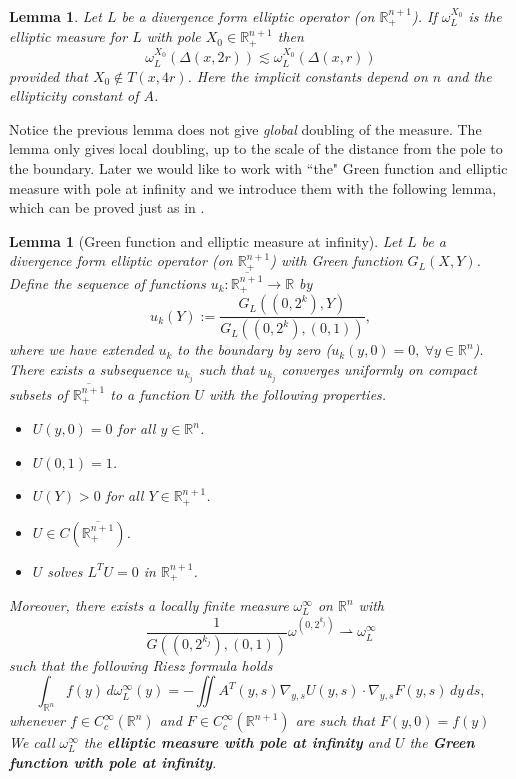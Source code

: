 \documentclass[11pt, a4paper,leqno]{amsart}
\theoremstyle{plain}
\newtheorem{lemma}[equation]{Lemma}
\theoremstyle{definition}
\theoremstyle{remark}
\numberwithin{equation}{section}
\newcommand{\re}{\mathbb{R}}
\newcommand{\rn}{\mathbb{R}^n}
\newcommand{\ree}{\mathbb{R}^{n+1}}
\newcommand{\hm}{\omega}
\begin{document}
\begin{lemma}\label{hmdoub.lem}
Let $L$ be a divergence form elliptic operator (on $\ree_+$). If $\hm^{X_0}_L$ is the elliptic measure for $L$ with pole $X_0 \in \ree_+$ then
\[\hm_L^{X_0}(\Delta(x,2r)) \lesssim \hm^{X_0}_L(\Delta(x,r)) \]
provided that $X_0 \not\in T(x,4r)$. Here the implicit constants depend on $n$ and the ellipticity constant of $A$.
\end{lemma}
Notice the previous lemma does not give {\it global} doubling of the measure. The lemma only gives local doubling, up to the scale of the distance from the pole to the boundary. Later we would like to work with ``the" Green function and elliptic measure with pole at infinity and we introduce them with the following lemma, which can be proved just as in \cite[Corollary 3.2]{KT-ann}.

\begin{lemma}[Green function and elliptic measure at infinity]\label{def:Greeninf}
Let $L$ be a divergence form elliptic operator (on $\ree_+$) with Green function $G_L(X,Y)$. Define the sequence of functions $u_k: \overline{\ree_+} \to \re$ by 
\[u_k(Y) := \frac{G_L((0,2^{k}), Y)}{G_L((0,2^{k}), (0,1))},\]
where we have extended $u_k$ to the boundary by zero ($u_k(y,0) = 0, \ \forall y \in \rn$). There exists a subsequence $u_{k_j}$ such that $u_{k_j}$ converges uniformly on compact subsets of $\overline{\ree_+}$ to a function $U$ with the following properties.
\begin{itemize}
\item $U(y,0) = 0$ for all $y \in \rn$.
\item $U(0,1) = 1$.
\item $U(Y) > 0$ for all $Y \in \ree_+$.
\item $U \in C(\overline{\ree_+})$.
\item $U$ solves $L^T U = 0$ in $\ree_+$.
\end{itemize}
Moreover, there exists a locally finite measure $\hm^\infty_L$ on $\rn$ with
\[\frac{1}{G((0,2^{k_j}),(0,1))} \hm^{(0,2^{k_j})}  \rightharpoonup   \hm^\infty_L \]
such that the following Riesz formula holds
\begin{equation}\label{Rieszformulainfty.eq}
\int_{\rn} f(y) \, d\hm^\infty_L(y) = - \iint A^T(y,s)\nabla_{y,s}U(y,s) \cdot \nabla_{y,s} F(y,s) \, dy \, ds,
\end{equation}
whenever $f \in C_c^\infty(\rn)$ and $F \in C_c^\infty(\ree)$ are such that $F(y,0) = f(y)$
We call $\hm^\infty_L$ the {\bf elliptic measure with pole at infinity} and $U$ the {\bf Green function with pole at infinity}.
\end{lemma}
\end{document}
